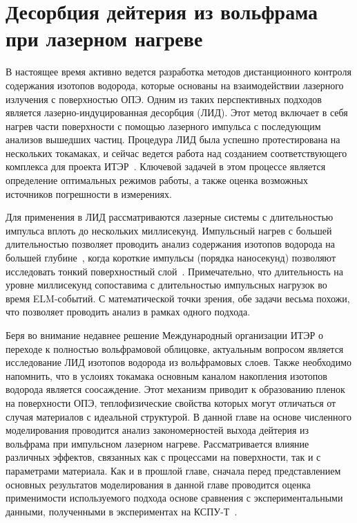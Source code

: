 \chapter{Десорбция дейтерия из вольфрама при лазерном нагреве}\label{ch:ch4}

В настоящее время активно ведется разработка методов дистанционного контроля содержания изотопов водорода, которые основаны на взаимодействии лазерного излучения с поверхностью ОПЭ. Одним из таких перспективных подходов является лазерно-индуцированная десорбция (ЛИД). Этот метод включает в себя нагрев части поверхности с помощью лазерного импульса с последующим анализов вышедших частиц. Процедура ЛИД была успешно протестирована на нескольких токамаках, и сейчас ведется работа над созданием соответствующего комплекса для проекта ИТЭР~\cite{Zlobinski2024}. Ключевой задачей в этом процессе является определение оптимальных режимов работы, а также оценка возможных источников погрешности в измерениях.

Для применения в ЛИД рассматриваются лазерные системы с длительностью импульса вплоть до нескольких миллисекунд. Импульсный нагрев с большей длительностью позволяет проводить анализ содержания изотопов водорода на большей глубине~\cite{Yu2019, Zlobinski2020}, когда короткие импульсы (порядка наносекунд) позволяют исследовать тонкий поверхностный слой~\cite{Gasparyan2021}. Примечательно, что длительность на уровне миллисекунд сопоставима с длительностью импульсных нагрузок во время ELM-событий. С математической точки зрения, обе задачи весьма похожи, что позволяет проводить анализ в рамках одного подхода.  

Беря во внимание недавнее решение Международный организации ИТЭР о переходе к полностью вольфрамовой облицовке, актуальным вопросом является исследование ЛИД изотопов водорода из вольфрамовых слоев. Также необходимо напомнить, что в услоиях токамака основным каналом накопления изотопов водорода является соосаждение. Этот механизм приводит к образованию пленок на поверхности ОПЭ, теплофизические свойства которых могут отличаться от случая материалов с идеальной структурой. В данной главе на основе численного моделирования проводится анализ закономерностей выхода дейтерия из вольфрама при импульсном лазерном нагреве. Рассматривается влияние различных эффектов, связанных как с процессами на поверхности, так и с параметрами материала. Как и в прошлой главе, сначала перед представлением основных результатов моделирования в данной главе проводится оценка применимости используемого подхода основе сравнения с экспериментальными данными, полученными в экспериментах на КСПУ-Т~\cite{Poskakalov2020}. 

